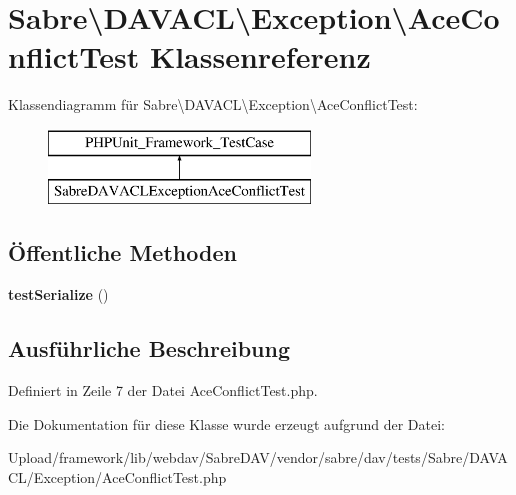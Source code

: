 \hypertarget{class_sabre_1_1_d_a_v_a_c_l_1_1_exception_1_1_ace_conflict_test}{}\section{Sabre\textbackslash{}D\+A\+V\+A\+CL\textbackslash{}Exception\textbackslash{}Ace\+Conflict\+Test Klassenreferenz}
\label{class_sabre_1_1_d_a_v_a_c_l_1_1_exception_1_1_ace_conflict_test}
Klassendiagramm für Sabre\textbackslash{}D\+A\+V\+A\+CL\textbackslash{}Exception\textbackslash{}Ace\+Conflict\+Test\+:\begin{figure}[H]
\begin{center}
\leavevmode
\includegraphics[height=2.000000cm]{class_sabre_1_1_d_a_v_a_c_l_1_1_exception_1_1_ace_conflict_test}
\end{center}
\end{figure}
\subsection*{Öffentliche Methoden}
\begin{DoxyCompactItemize}
\item 
\mbox{\label{class_sabre_1_1_d_a_v_a_c_l_1_1_exception_1_1_ace_conflict_test_aa67a7cf69cb118f0bb8cf46bfec175fa}} 
{\bfseries test\+Serialize} ()
\end{DoxyCompactItemize}


\subsection{Ausführliche Beschreibung}


Definiert in Zeile 7 der Datei Ace\+Conflict\+Test.\+php.



Die Dokumentation für diese Klasse wurde erzeugt aufgrund der Datei\+:\begin{DoxyCompactItemize}
\item 
Upload/framework/lib/webdav/\+Sabre\+D\+A\+V/vendor/sabre/dav/tests/\+Sabre/\+D\+A\+V\+A\+C\+L/\+Exception/Ace\+Conflict\+Test.\+php\end{DoxyCompactItemize}
